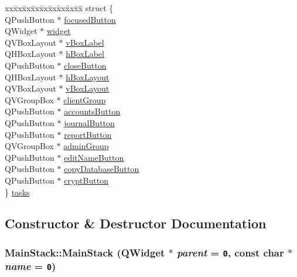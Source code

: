 \begin{CompactItemize}
\begin{tabbing}
\end{tabbing}\item 
\begin{tabbing}
xx\=xx\=xx\=xx\=xx\=xx\=xx\=xx\=xx\=\kill
struct \{\\
\>QPushButton $\ast$ \hyperlink{classMainStack_r18}{focusedButton}\\
\>QWidget $\ast$ \hyperlink{classMainStack_r19}{widget}\\
\>QVBoxLayout $\ast$ \hyperlink{classMainStack_r20}{vBoxLabel}\\
\>QHBoxLayout $\ast$ \hyperlink{classMainStack_r21}{hBoxLabel}\\
\>QPushButton $\ast$ \hyperlink{classMainStack_r22}{closeButton}\\
\>QHBoxLayout $\ast$ \hyperlink{classMainStack_r23}{hBoxLayout}\\
\>QVBoxLayout $\ast$ \hyperlink{classMainStack_r24}{vBoxLayout}\\
\>QVGroupBox $\ast$ \hyperlink{classMainStack_r25}{clientGroup}\\
\>QPushButton $\ast$ \hyperlink{classMainStack_r26}{accountsButton}\\
\>QPushButton $\ast$ \hyperlink{classMainStack_r27}{journalButton}\\
\>QPushButton $\ast$ \hyperlink{classMainStack_r28}{reportButton}\\
\>QVGroupBox $\ast$ \hyperlink{classMainStack_r29}{adminGroup}\\
\>QPushButton $\ast$ \hyperlink{classMainStack_r30}{editNameButton}\\
\>QPushButton $\ast$ \hyperlink{classMainStack_r31}{copyDatabaseButton}\\
\>QPushButton $\ast$ \hyperlink{classMainStack_r32}{cryptButton}\\
\} \hyperlink{classMainStack_r33}{tasks}\\

\end{tabbing}\end{CompactItemize}


\subsection{Constructor \& Destructor Documentation}
\hypertarget{classMainStack_a0}{
\subsubsection[MainStack]{\setlength{\rightskip}{0pt plus 5cm}Main\-Stack::Main\-Stack (QWidget $\ast$ {\em parent} = {\tt 0}, const char $\ast$ {\em name} = {\tt 0})}}
\label{classMainStack_a0}


